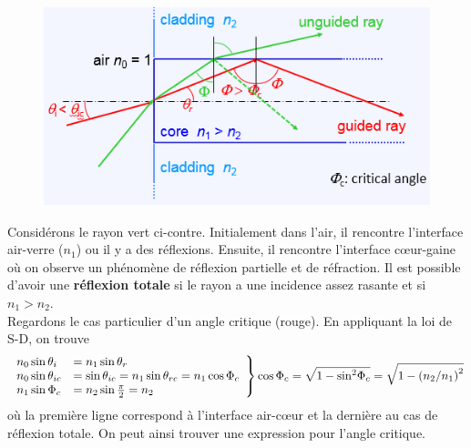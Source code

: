 	\begin{figure}
	\vspace{-9mm}
	\includegraphics[scale=0.6]{ch1/image3}
	\end{figure}
Considérons le rayon vert ci-contre. Initialement dans l'air, il rencontre l'interface air-verre ($
n_1$) ou il y a des réflexions. Ensuite, il rencontre l'interface cœur-gaine où on observe un 
phénomène de réflexion partielle et de réfraction. Il est possible d'avoir une \textbf{réflexion
totale} si le rayon a une incidence assez rasante et si $n_1>n_2$.\\

Regardons le cas particulier d'un angle critique (rouge). En appliquant la loi de S-D, on trouve
\begin{equation}
\left.\begin{array}{ll}
{n_0}\sin {\theta _i} &= {n_1}\sin {\theta _r}\\
{n_0}\sin {\theta _{ic}} &= \sin {\theta _{ic}} = {n_1}\sin {\theta _{rc}} = {n_1}\cos {\Phi _c}\\
{n_1}\sin {\Phi _c} &= {n_2}\sin \frac{\pi }{2} = {n_2}
\end{array}\right\}\cos {\Phi _c} = \sqrt {1 - {{\sin }^2}{\Phi _c}} = \sqrt {1 - {{\left( {{{{n_2}} \mathord{\left/
 {\vphantom {{{n_2}} {{n_1}}}} \right.
 \kern-\nulldelimiterspace} {{n_1}}}} \right)}^2}}
\end{equation}
où la première ligne correspond à l'interface air-cœur et la dernière au cas de réflexion totale. On 
peut ainsi trouver une expression pour l'angle critique. \\

\ \\

